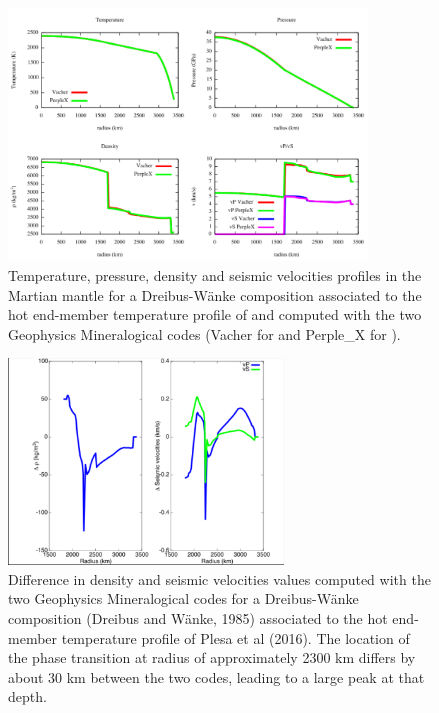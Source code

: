 \begin{figure}[h!]
\begin{center}
\includegraphics[width=0.85\textwidth]
{figures/FigDWTh.png}
\caption{Temperature, pressure, density and seismic velocities profiles in the Martian mantle for a Dreibus-W\"{a}nke composition \citep{Dreibus&Wanke1985} associated to the hot end-member temperature profile of \cite{Plesa2016} and computed with the two Geophysics Mineralogical codes (Vacher for \cite{Vacher1998} and Perple\_X for \cite{Connolly2005}).}
\label{fig:FigDWTh.png} 
\end{center}
\end{figure}

\begin{figure}[h!]
\begin{center}
\includegraphics[width=0.65\textwidth]
{figures/FigDWThdiff.png}
\caption{Difference in density and seismic velocities values computed with the two Geophysics Mineralogical codes for a Dreibus-W\"{a}nke composition (Dreibus and W\"{a}nke, 1985) associated to the hot end-member temperature profile of Plesa et al (2016). The location of the phase transition at radius of approximately 2300 km differs by about 30 km between the two codes, leading to a large peak at that depth.}
\label{fig:FigDWThdiff.png} 
\end{center}
\end{figure}

